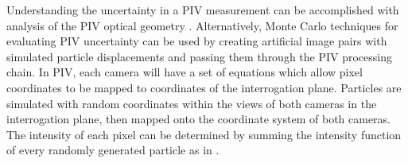 Understanding the uncertainty in a PIV measurement can be accomplished with 
analysis of the PIV optical geometry \cite{lawson1997b}. Alternatively, Monte 
Carlo techniques for evaluating PIV uncertainty can be used by creating 
artificial image pairs with simulated particle displacements and passing them 
through the PIV processing chain. In PIV, each camera will have a set of 
equations which allow pixel coordinates to be mapped to coordinates of the 
interrogation plane. Particles are simulated with random coordinates within the 
views of both cameras in the interrogation plane, then mapped onto the 
coordinate system of both cameras. The intensity of each pixel can be 
determined by summing the intensity function of every randomly generated 
particle as in \cite{adeyinka2005,fouras2007}.





